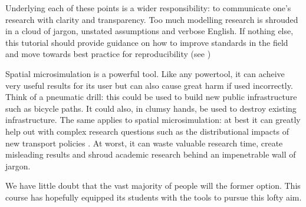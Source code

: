 \documentclass[a4paper, 11pt, twoside]{article}
\begin{document}
Underlying each of these points is a wider responsibility: to communicate one's research
with clarity and transparency. Too much modelling research is shrouded in a cloud of jargon,
unstated assumptions and verbose English. If nothing else, this tutorial should
provide guidance on how to improve standards in the field and move towards best practice
for reproducibility (see \citep{Peng2006})

Spatial microsimulation is a powerful tool.
Like any powertool, it can acheive very useful results for its user
but can also cause great harm if used incorrectly. 
Think of a pneumatic drill: this could be used to build new
public infrastructure such as bicycle paths. It could also,
in clumsy hands, be used to destroy existing infrastructure.
The same applies to spatial microsimulation:
at best it can greatly help out with complex research questions such
as the distributional impacts of new transport policies \citep{Lovelace2014-jtg}.
At worst, it can waste valuable research time, create misleading results
and shroud academic research behind an impenetrable wall of jargon.

We have little doubt that the vast majority of
people will the former option. This course has hopefully
equipped its students with
the tools to pursue this lofty aim.
\end{document}
